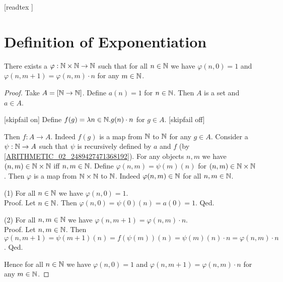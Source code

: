\documentclass[10pt]{article}
\begin{document}
  \begin{imports}
    \begin{forthel}

      [readtex ]

    \end{forthel}
  \end{imports}


  \section{Definition of Exponentiation}

  \begin{forthel}
    \begin{lemma}
      There exists a $\varphi : \mathbb{N} \times \mathbb{N} \to \mathbb{N}$ such
      that for all $n \in \mathbb{N}$ we have $\varphi(n, 0) = 1$ and
      $\varphi(n, m + 1) = \varphi(n,m) \cdot n$ for any $m \in \mathbb{N}$.
    \end{lemma}
    \begin{proof}
      Take $A = [\mathbb{N} \to \mathbb{N}]$.
      Define $a(n) = 1$ for $n \in \mathbb{N}$.
      Then $A$ is a set and $a \in A$.

      [skipfail on] %
      Define $f(g) = \mathrm{\lambda} n \in \mathbb{N}. g(n) \cdot n$ for $g \in A$.
      [skipfail off]

      Then $f : A \to A$.
      Indeed $f(g)$ is a map from $\mathbb{N}$ to $\mathbb{N}$ for any $g \in A$.
      Consider a $\psi : \mathbb{N} \to A$ such that $\psi$ is recursively defined by
      $a$ and $f$ (by \cref{ARITHMETIC_02_2489427471368192}).
      For any objects $n, m$ we have $(n,m) \in \mathbb{N} \times \mathbb{N}$ iff
      $n, m \in \mathbb{N}$.
      Define $\varphi(n,m) = \psi(m)(n)$ for $(n,m) \in \mathbb{N} \times \mathbb{N}$.
      Then $\varphi$ is a map from $\mathbb{N} \times \mathbb{N}$ to $\mathbb{N}$.
      Indeed $\varphi(n,m) \in \mathbb{N}$ for all $n, m \in \mathbb{N}$.

      (1) For all $n \in \mathbb{N}$ we have $\varphi(n,0) = 1$. \\
      Proof.
        Let $n \in \mathbb{N}$.
        Then $\varphi(n,0)
          = \psi(0)(n)
          = a(0)
          = 1$.
      Qed.

      (2) For all $n, m \in \mathbb{N}$ we have $\varphi(n, m + 1) =
      \varphi(n,m) \cdot n$. \\
      Proof.
        Let $n, m \in \mathbb{N}$.
        Then $\varphi(n, m + 1)
          = \psi(m + 1)(n)
          = f(\psi(m))(n)
          = \psi(m)(n) \cdot n
          = \varphi(n,m) \cdot n$.
      Qed.

      Hence for all $n \in \mathbb{N}$ we have $\varphi(n, 0) = 1$ and
      $\varphi(n, m + 1) = \varphi(n,m) \cdot n$ for any $m \in \mathbb{N}$.
    \end{proof}
  \end{forthel}
\end{document}
